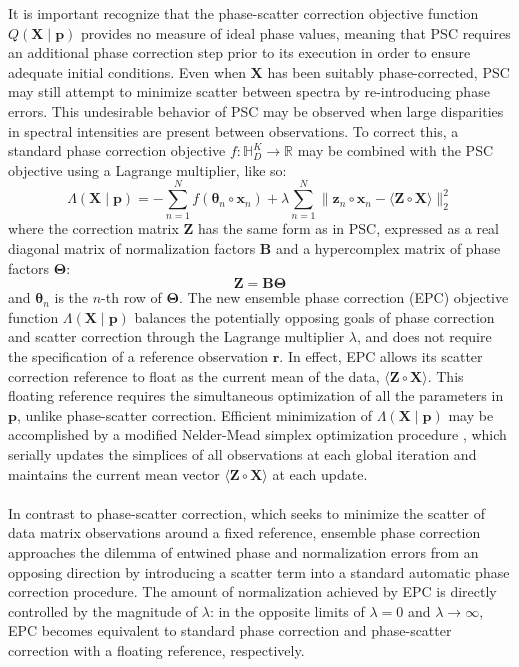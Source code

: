 \begin{doublespace}
It is important recognize that the phase-scatter correction objective function
$Q(\mathbf{X} \mid \mathbf{p})$ provides no measure of ideal phase values,
meaning that PSC requires an additional phase correction step prior to its
execution in order to ensure adequate initial conditions. Even when
$\mathbf{X}$ has been suitably phase-corrected, PSC may still attempt to
minimize scatter between spectra by re-introducing phase errors. This
undesirable behavior of PSC may be observed when large disparities in
spectral intensities are present between observations. To correct this,
a standard phase correction objective
$f : \mathbb{H}_D^{K} \to \mathbb{R}$ may be combined with
the PSC objective using a Lagrange multiplier, like so:
\begin{equation}
\Lambda(\mathbf{X} \mid \mathbf{p}) =
 -\sum_{n=1}^N f(\boldsymbol{\theta}_n \circ \mathbf{x}_n) +
 \lambda \sum_{n=1}^N \| \mathbf{z}_n \circ \mathbf{x}_n -
            \langle \mathbf{Z} \circ \mathbf{X} \rangle \|_2^2
\end{equation}
where the correction matrix $\mathbf{Z}$ has the same form as in PSC, expressed
as a real diagonal matrix of normalization factors $\mathbf{B}$ and a
hypercomplex matrix of phase factors $\mathbf{\Theta}$:
\begin{equation}
\mathbf{Z} = \mathbf{B} \mathbf{\Theta}
\end{equation}
and $\boldsymbol{\theta}_n$ is the $n$-th row of $\mathbf{\Theta}$. The new
ensemble phase correction (EPC) objective function
$\Lambda(\mathbf{X} \mid \mathbf{p})$ balances the potentially opposing goals
of phase correction and scatter correction through the Lagrange multiplier
$\lambda$, and does not require the specification of a reference observation
$\mathbf{r}$. In effect, EPC allows its scatter correction reference to float
as the current mean of the data, $\langle \mathbf{Z} \circ \mathbf{X} \rangle$.
This floating reference requires the simultaneous optimization of all the
parameters in $\mathbf{p}$, unlike phase-scatter correction. Efficient
minimization of $\Lambda(\mathbf{X} \mid \mathbf{p})$ may be accomplished by
a modified Nelder-Mead simplex optimization procedure \cite{nelder:compj1964},
which serially updates the simplices of all observations at each global
iteration and maintains the current mean vector
$\langle \mathbf{Z} \circ \mathbf{X} \rangle$ at each update.
\\\\
In contrast to phase-scatter correction, which seeks to minimize the scatter
of data matrix observations around a fixed reference, ensemble phase correction
approaches the dilemma of entwined phase and normalization errors from an
opposing direction by introducing a scatter term into a standard automatic
phase correction procedure. The amount of normalization achieved by EPC is
directly controlled by the magnitude of $\lambda$: in the opposite limits of
$\lambda = 0$ and $\lambda \to \infty$, EPC becomes equivalent to standard
phase correction and phase-scatter correction with a floating reference,
respectively.
\end{doublespace}

